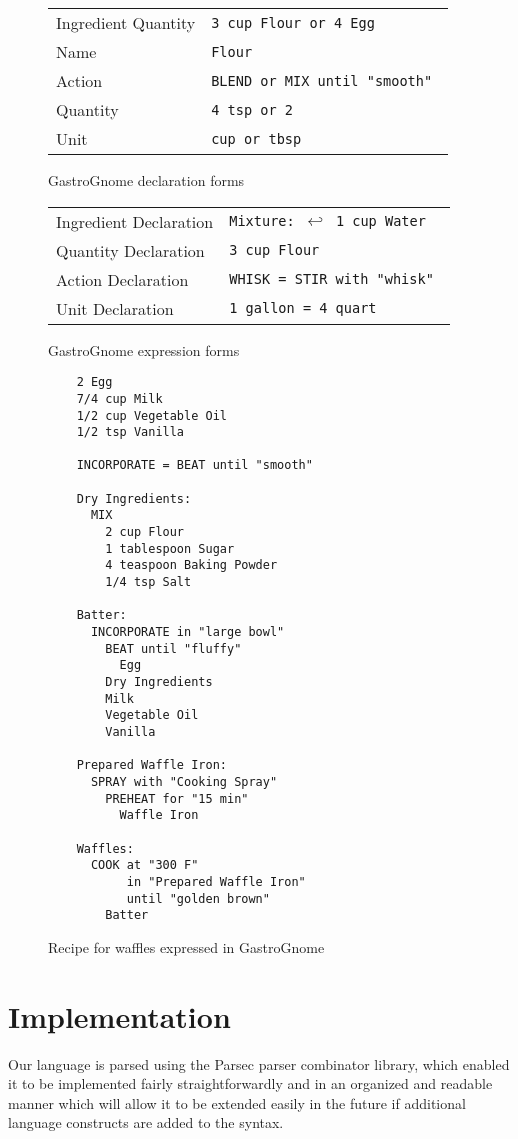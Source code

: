 \documentclass[pldi]{sigplanconf-pldi15}
\begin{document}
\begin{figure}
	\begin{tabular}{ l l }
		Ingredient Quantity & \tt 3 cup Flour \rm or \tt 4 Egg \\
		Name & \tt Flour \\
		Action & \tt BLEND \rm or \tt MIX until "smooth" \\
		Quantity & \tt 4 tsp \rm or \tt 2 \\
		Unit & \tt cup \rm or \tt tbsp
	\end{tabular}
	\caption{GastroGnome declaration forms}
	\label{fig:dec}
\end{figure}	
\begin{figure}	
	\begin{tabular}{ l l }
		Ingredient Declaration & \tt Mixture: $\hookleftarrow$ 1 cup Water \\ 
		Quantity Declaration & \tt 3 cup Flour \\
		Action Declaration & \tt WHISK = STIR with "whisk" \\
		Unit Declaration & \tt 1 gallon = 4 quart
	\end{tabular}
	\caption{GastroGnome expression forms}
	\label{fig:exp}
\end{figure}

\begin{figure}
	\begin{verbatim}
	2 Egg
	7/4 cup Milk
	1/2 cup Vegetable Oil
	1/2 tsp Vanilla

	INCORPORATE = BEAT until "smooth"

	Dry Ingredients:
	  MIX
	    2 cup Flour
	    1 tablespoon Sugar
	    4 teaspoon Baking Powder
	    1/4 tsp Salt
 
	Batter:
	  INCORPORATE in "large bowl" 
	    BEAT until "fluffy"
	      Egg
	    Dry Ingredients
	    Milk
	    Vegetable Oil
	    Vanilla

	Prepared Waffle Iron:
	  SPRAY with "Cooking Spray"
	    PREHEAT for "15 min"
	      Waffle Iron
 
	Waffles:
	  COOK at "300 F"
	  	   in "Prepared Waffle Iron"
	  	   until "golden brown"
	    Batter	
	\end{verbatim}
	\caption{Recipe for waffles expressed in GastroGnome}
	\label{fig:waffles}
\end{figure}

\section{Implementation}
Our language is parsed using the Parsec parser combinator library, which
enabled it to be implemented fairly straightforwardly and in an organized and
readable manner which will allow it to be extended easily in the future if
additional language constructs are added to the syntax.
\end{document}

